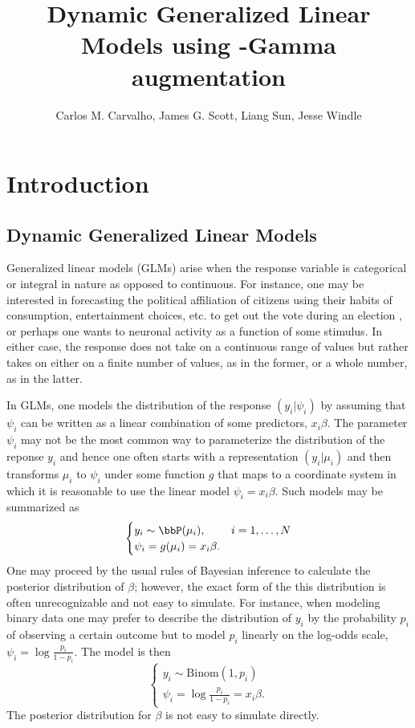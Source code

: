 \documentclass[11pt]{article}
\title{Dynamic Generalized Linear Models using \Polya-Gamma augmentation}
\author{Carlos M. Carvalho, James G. Scott, Liang Sun, Jesse Windle}
\begin{document}
\maketitle
\tableofcontents

\newpage

\section{Introduction}

\subsection{Dynamic Generalized Linear Models}

Generalized linear models (GLMs) arise when the response variable is categorical
or integral in nature as opposed to continuous.  For instance, one may be
interested in forecasting the political affiliation of citizens using their
habits of consumption, entertainment choices, etc. to get out the vote during an
election \citep{becker-12-0922}, or perhaps one wants to neuronal activity as a
function of some stimulus.  In either case, the response does not take on a
continuous range of values but rather takes on either on a finite number of
values, as in the former, or a whole number, as in the latter.

In GLMs, one models the distribution of the response $(y_i | \psi_i)$ by
assuming that $\psi_i$ can be written as a linear combination of some
predictors, $x_i \beta$.  The parameter $\psi_i$ may not be the most common way
to parameterize the distribution of the reponse $y_i$ and hence one often starts
with a representation $(y_i | \mu_i)$ and then transforms $\mu_i$ to $\psi_i$
under some function $g$ that maps to a coordinate system in which it is
reasonable to use the linear model $\psi_i = x_i \beta$.  Such models may be
summarized as
\[
\begin{cases}
y_i \sim \bbP(\mu_i), & i=1,\ldots, N \\
\psi_i = g(\mu_i) = x_i \beta.
\end{cases}
\]
One may proceed by the usual rules of Bayesian inference to calculate the
posterior distribution of $\beta$; however, the exact form of the this
distribution is often unrecognizable and not easy to simulate.  For instance,
when modeling binary data one may prefer to describe the distribution of $y_i$
by the probability $p_i$ of observing a certain outcome but to model $p_i$
linearly on the log-odds scale, $\psi_i = \log \frac{p_i}{1-p_i}$.  The model is
then
\[
\begin{cases}
y_i \sim \text{Binom}(1,p_i) \\
\psi_i = \log \frac{p_i}{1-p_i} = x_i \beta.
\end{cases}
\]
The posterior distribution for $\beta$ is not easy to simulate directly.
\end{document}
